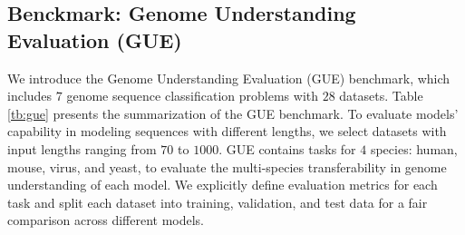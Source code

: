 \documentclass{article}
\begin{document}
\subsection{Benckmark: Genome Understanding Evaluation (GUE)}
\label{subsec:data_finetune}


\begin{table*}[t]
	\centering
	\footnotesize
	\caption{ \footnotesize  
		Summarization of the Genome Understanding Evaluation (GUE) benchmark.
	}\label{tb:gue}
\end{table*}



We introduce the Genome Understanding Evaluation (GUE) benchmark, which includes $7$ genome sequence classification problems with $28$ datasets. Table \ref{tb:gue} presents the summarization of the GUE benchmark. To evaluate models' capability in modeling sequences with different lengths, we select datasets with input lengths ranging from $70$ to $1000$. GUE contains tasks for $4$ species: human, mouse, virus, and yeast, to evaluate the multi-species transferability in genome understanding of each model. We explicitly define evaluation metrics for each task and split each dataset into training, validation, and test data for a fair comparison across different models.
\end{document}

